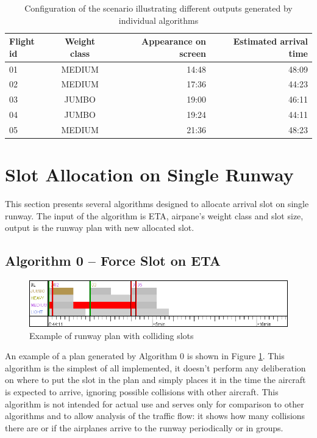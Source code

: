 \begin{table}[h]
  \centering
\begin{tabular}{ | l | c | r | r | }
\hline
Flight id   & Weight class & Appearance on screen & Estimated arrival time \\
\hline
01          & MEDIUM       & 14:48                & 48:09 \\
02          & MEDIUM       & 17:36                & 44:23 \\
03          & JUMBO        & 19:00                & 46:11 \\
04          & JUMBO        & 19:24                & 44:11 \\
05          & MEDIUM       & 21:36                & 48:23 \\
\hline
\end{tabular}
  \caption{Configuration of the scenario illustrating different outputs generated by individual algorithms}
  \label{tab:config-simple}
\end{table}

\section{Slot Allocation on Single Runway}

\label{section:slot-selection}

This section presents several algorithms designed to allocate arrival slot on single runway. The input of the algorithm is ETA, airpane's weight class and slot size, output is the runway plan with new allocated slot.

\subsection{Algorithm 0 – Force Slot on ETA}

\begin{figure}[h]
    \centering
    \includegraphics[width=\textwidth]{figures/rwy-in-place.png}
    \caption{Example of runway plan with colliding slots}
    \label{fig:rwy-in-place}
\end{figure}

An example of a plan generated by Algorithm 0 is shown in Figure \ref{fig:rwy-in-place}. This algorithm is the simplest of all implemented, it doesn't perform any deliberation on where to put the slot in the plan and simply places it in the time the aircraft is expected to arrive, ignoring possible collisions with other aircraft. This algorithm is not intended for actual use and serves only for comparison to other algorithms and to allow analysis of the traffic flow: it shows how many collisions there are or if the airplanes arrive to the runway periodically or in groups.

